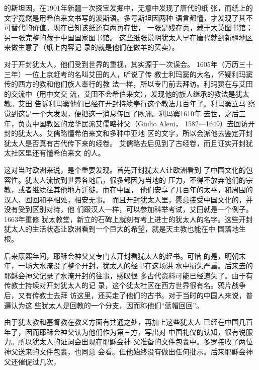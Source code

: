 的斯坦因，在1901年新疆一次探宝发掘中，无意中发现了唐代的纸%
张，而纸上的文字竟然是用希伯来文书写的波斯语。多亏斯坦因两种%
语言都懂，才发现了其不可替代的价值。现在已知该纸还有两页存世，%
一张是残存页，藏于大英图书馆；另一张完整的藏于中国国家图书馆。%
这些纸张说明犹太人早在唐代就到新疆地区来做生意了（纸上内容记%
录的就是他们在做羊的买卖）。%
\par
对于开封犹太人，他们受到世界的重视，其实源于一次误会。%
1605年（万历三十三年）一位上京赶考的名叫艾田的人，听说了传%
教士利玛窦的大名，怀疑利玛窦传的西方的教和他们族人奉行的教%
法一样，所以专门前去拜访。利玛窦在与艾田的交流中（用中文交%
流，艾田不会希伯来文），发现他的族人继承的教法是犹太教。艾田%
告诉利玛窦他们已经在开封持续奉行这个教法几百年了。利玛窦立马%
察觉到这是一个大发现，便把这一消息传回了欧洲。利玛窦1610年%
去世，之后三年，负责中国教区的龙华民派艾儒略神父（Giulio Aleni，%
1582—1649）去回访开封的犹太人。艾儒略懂希伯来文和多种中亚地%
区的文字，所以会派他去鉴定开封犹太人是否真有古代传下来的经卷。%
艾儒略去后见到了古经卷，而且证实开封犹太社区里还有懂希伯来文%
的人。%
\par
这对当时欧洲来说，是个重要发现。首先开封犹太人让欧洲看到%
了中国文化的包容性。犹太人流散到世界各地后，很多都因为当地的%
压力，不得不放弃他们的宗教，或者继续往其他地方迁徙。而在中国，%
他们安享了几百年的太平，和周围的汉人、回回和平相处，相安无事。%
而且开封犹太人里，愿意接受中国文化的，并没有受到区别对待，他%
们跟汉人一样，可以参加科举考试，艾田就是一个例子。1663年重修%
犹太教堂，新立的石碑上就刻有考上进士的犹太人的名字。这些开封%
犹太人的生活状态让欧洲看到一个巨大的希望，就是天主教也能在中%
国落地生根。%
\par
后来康熙年间，耶稣会神父又专门去开封看犹太人的经书。可惜%
的是，明朝末年，一场大水淹没了整个开封，犹太人的经书在这场洪%
水中损失严重。后来去的耶稣会神父记录了水淹开封的往事，感叹很%
多古代资料可能已经遗失了。由于有传教士持续对开封犹太人的记%
录，这个犹太社区在西方世界很有名。鸦片战争后，又有传教士去拜%
访这里，还买走了他们的古书。对于当时的中国人来说，普遍认为这%
些犹太人是回教的一个分支，因而称他们“蓝帽回回”。%
\par
由于犹太教和基督教在教义方面有共通之处，再加上这些犹太人%
已经在中国几百年了，因而耶稣会神父认为他们作为第三方，写出对%
中国礼仪的认知，很有说服力。所以犹太人的证词会出现在耶稣会神%
父准备的文件包裹中。多罗接收了两位神父送来的文件包裹，也同意%
会看。但他始终没有做出任何批示。后来耶稣会神父还催促过几次，%
